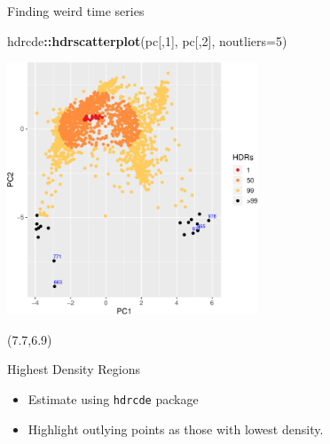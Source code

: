 \documentclass[14pt,ignorenonframetext,]{beamer}
\newenvironment{Shaded}{\begin{snugshade}}{\end{snugshade}}
\newcommand{\DataTypeTok}[1]{\textcolor[rgb]{0.13,0.29,0.53}{#1}}
\newcommand{\DecValTok}[1]{\textcolor[rgb]{0.00,0.00,0.81}{#1}}
\newcommand{\KeywordTok}[1]{\textcolor[rgb]{0.13,0.29,0.53}{\textbf{#1}}}
\newcommand{\NormalTok}[1]{#1}
\newcommand{\OperatorTok}[1]{\textcolor[rgb]{0.81,0.36,0.00}{\textbf{#1}}}
\providecommand{\tightlist}{%
  \setlength{\itemsep}{0pt}\setlength{\parskip}{0pt}}
\renewenvironment{Shaded}{\color{black}\begin{snugshade}\color{black}}{\end{snugshade}}
\begin{document}
\begin{frame}[fragile]{Finding weird time series}
\protect\hypertarget{finding-weird-time-series}{}

\fontsize{10}{10}\sf

\begin{Shaded}
\begin{Highlighting}[]
\NormalTok{hdrcde}\OperatorTok{::}\KeywordTok{hdrscatterplot}\NormalTok{(pc[,}\DecValTok{1}\NormalTok{], pc[,}\DecValTok{2}\NormalTok{], }\DataTypeTok{noutliers=}\DecValTok{5}\NormalTok{)}
\end{Highlighting}
\end{Shaded}

\vspace*{-0.25cm}

\includegraphics[width=7.5cm]{HDRYahoo}

\begin{textblock}{4.8}(7.7,6.9)\fontsize{10}{10}\sf
\begin{alertblock}{\fontsize{10}{10}\sffamily Highest Density Regions}
\begin{itemize}\tightlist
\item Estimate using \texttt{hdrcde} package
\item Highlight outlying points as those with lowest density.
\end{itemize}
\end{alertblock}
\end{textblock}

\end{frame}
\end{document}

